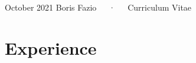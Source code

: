 \documentclass[11pt, a4paper]{awesome-cv}
\begin{document}
\makecvheader

\makecvfooter
  {October 2021}
    {Boris Fazio~~~·~~~Curriculum Vitae}
  {\thepage}





\hypertarget{experience}{%
\section{Experience}\label{experience}}
\end{document}

